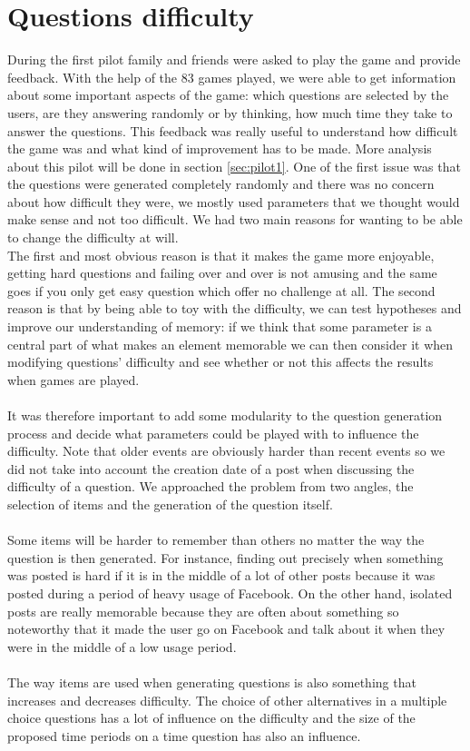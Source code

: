 \chapter{Questions difficulty}
During the first pilot family and friends were asked to play the game and provide feedback. With the help of the 83 games played, we were able to get information about some important aspects of the game: which questions are selected by the users, are they answering randomly or by thinking, how much time they take to answer the questions. This feedback was really useful to understand how difficult the game was and what kind of improvement has to be made. More analysis about this pilot will be done in section \ref{sec:pilot1}. One of the first issue was that the questions were generated completely randomly and there was no concern about how difficult they were, we mostly used parameters that we thought would make sense and not too difficult. We had two main reasons for wanting to be able to change the difficulty at will.\\
The first and most obvious reason is that it makes the game more enjoyable, getting hard questions and failing over and over is  not amusing and the same goes if you only get easy question which offer no challenge at all. The second reason is that by being able to toy with the difficulty, we can test hypotheses and improve our understanding of memory: if we think that some parameter is a central part of what makes an element memorable we can then consider it when modifying questions' difficulty and see whether or not this affects the results when games are played.\\\\
It was therefore important to add some modularity to the question generation process and decide what parameters could be played with to influence the difficulty. Note that older events are obviously harder than recent events so we did not take into account the creation date of a post when discussing the difficulty of a question. We approached the problem from two angles, the selection of items and the generation of the question itself.\\\\
Some items will be harder to remember than others no matter the way the question is then generated. For instance, finding out precisely when something was posted is hard if it is in the middle of a lot of other posts because it was posted during a period of heavy usage of Facebook. On the other hand, isolated posts are really memorable because they are often about something so noteworthy that it made the user go on Facebook and talk about it when they were in the middle of a low usage period.\\\\
The way items are used when generating questions is also something that increases and decreases difficulty. The choice of other alternatives in a multiple choice questions has a lot of influence on the difficulty and the size of the proposed time periods on a time question has also an influence.

